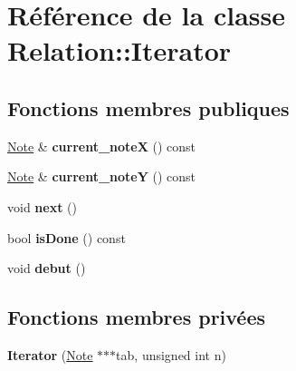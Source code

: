 \hypertarget{class_relation_1_1_iterator}{\section{Référence de la classe Relation\-:\-:Iterator}
\label{class_relation_1_1_iterator}
}
\subsection*{Fonctions membres publiques}
\begin{DoxyCompactItemize}
\item 
\hypertarget{class_relation_1_1_iterator_aa4c79c6d32dcdac36eb811571241c687}{\hyperlink{class_note}{Note} \& {\bfseries current\-\_\-note\-X} () const }\label{class_relation_1_1_iterator_aa4c79c6d32dcdac36eb811571241c687}

\item 
\hypertarget{class_relation_1_1_iterator_a41c4f483cc1128a7804bbd90ebdaf45e}{\hyperlink{class_note}{Note} \& {\bfseries current\-\_\-note\-Y} () const }\label{class_relation_1_1_iterator_a41c4f483cc1128a7804bbd90ebdaf45e}

\item 
\hypertarget{class_relation_1_1_iterator_a8ff276d2d33755160725b5dbc4a95a72}{void {\bfseries next} ()}\label{class_relation_1_1_iterator_a8ff276d2d33755160725b5dbc4a95a72}

\item 
\hypertarget{class_relation_1_1_iterator_a4e2f828ed25ce251c6b6c08dbf618372}{bool {\bfseries is\-Done} () const }\label{class_relation_1_1_iterator_a4e2f828ed25ce251c6b6c08dbf618372}

\item 
\hypertarget{class_relation_1_1_iterator_ad32460ec4bc8f8b3a38c64f8c7b57b8b}{void {\bfseries debut} ()}\label{class_relation_1_1_iterator_ad32460ec4bc8f8b3a38c64f8c7b57b8b}

\end{DoxyCompactItemize}
\subsection*{Fonctions membres privées}
\begin{DoxyCompactItemize}
\item 
\hypertarget{class_relation_1_1_iterator_a74986195817fbcd10909c05e39e2c595}{{\bfseries Iterator} (\hyperlink{class_note}{Note} $\ast$$\ast$$\ast$tab, unsigned int n)}\label{class_relation_1_1_iterator_a74986195817fbcd10909c05e39e2c595}

\end{DoxyCompactItemize}
